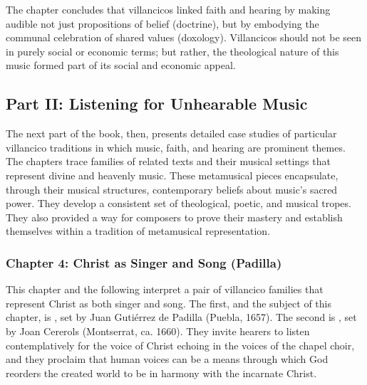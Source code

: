 \documentclass[tt]{vcbook-proposal}
\begin{document}
The chapter concludes that villancicos linked faith and hearing by making audible not just propositions of belief (doctrine), but by embodying the communal celebration of shared values (doxology).
Villancicos should not be seen in purely social or economic terms; but rather, the theological nature of this music formed part of its social and economic appeal.

\subsection{Part II: Listening for Unhearable Music}

The next part of the book, then, presents detailed case studies of particular villancico traditions in which music, faith, and hearing are prominent themes.
The chapters trace families of related texts and their musical settings that represent divine and heavenly music.
These metamusical pieces encapsulate, through their musical structures, contemporary beliefs about music's sacred power.
They develop a consistent set of theological, poetic, and musical tropes.
They also provided a way for composers to prove their mastery and establish themselves within a tradition of metamusical representation.

\subsubsection{Chapter 4: Christ as Singer and Song (Padilla)}

This chapter and the following interpret a pair of villancico families that represent Christ as both singer and song.
The first, and the subject of this chapter, is , set by Juan Gutiérrez de Padilla (Puebla, 1657).
The second is , set by Joan Cererols (Montserrat, ca. 1660).
They invite hearers to listen contemplatively for the voice of Christ echoing in the voices of the chapel choir, and they proclaim that human voices can be a means through which God reorders the created world to be in harmony with the incarnate Christ.
\end{document}
